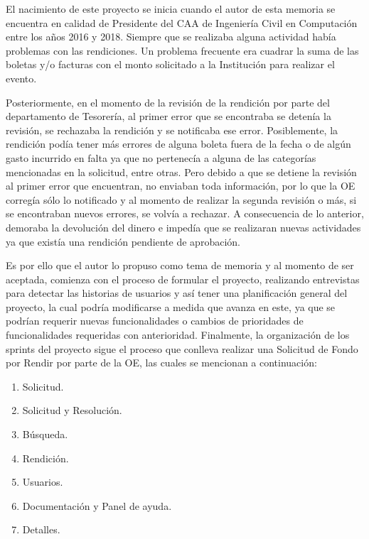 El nacimiento de este proyecto se inicia cuando el autor de esta memoria se encuentra en calidad de Presidente del CAA de Ingeniería Civil en Computación entre los años 2016 y 2018. Siempre que se realizaba alguna actividad había problemas con las rendiciones. Un problema frecuente era cuadrar la suma de las boletas y/o facturas con el monto solicitado a la Institución para realizar el evento. 

Posteriormente, en el momento de la revisión de la rendición por parte del departamento de Tesorería, al primer error que se encontraba se detenía la revisión, se rechazaba la rendición y se notificaba ese error. Posiblemente, la rendición podía tener más errores de alguna boleta fuera de la fecha o de algún gasto incurrido en falta ya que no pertenecía a alguna de las categorías mencionadas en la solicitud, entre otras. Pero debido a que se detiene la revisión al primer error que encuentran, no enviaban toda información, por lo que la OE corregía sólo lo notificado y al momento de realizar la segunda revisión o más, si se encontraban nuevos errores, se volvía a rechazar. A consecuencia de lo anterior, demoraba la devolución del dinero e impedía que se realizaran nuevas actividades ya que existía una rendición pendiente de aprobación.

Es por ello que el autor lo propuso como tema de memoria y al momento de ser aceptada, comienza con el proceso de formular el proyecto, realizando entrevistas para detectar las historias de usuarios y así tener una planificación general del proyecto, la cual podría modificarse a medida que avanza en este, ya que se podrían requerir nuevas funcionalidades o cambios de prioridades de funcionalidades requeridas con anterioridad. Finalmente, la organización de los sprints del proyecto sigue el proceso que conlleva realizar una Solicitud de Fondo por Rendir por parte de la OE, las cuales se mencionan a continuación:

\begin{enumerate}
    \item Solicitud.
    \item Solicitud y Resolución.
    \item Búsqueda.
    \item Rendición.
    \item Usuarios.
    \item Documentación y Panel de ayuda.
    \item Detalles.
\end{enumerate}

